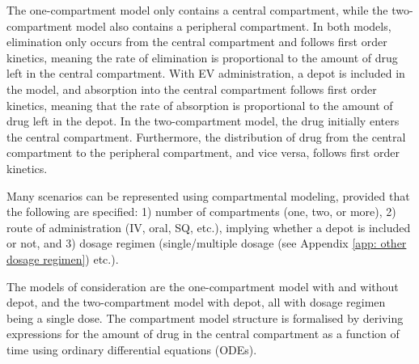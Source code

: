 
The one-compartment model only contains a central compartment, while the two-compartment model also contains a peripheral compartment.
In both models, elimination only occurs from the central compartment and follows first order kinetics, meaning the rate of elimination is proportional to the amount of drug left in the central compartment. With EV administration, a depot is included in the model, and absorption into the central compartment follows first order kinetics, meaning that the rate of absorption is proportional to the amount of drug left in the depot. 
In the two-compartment model, the drug initially enters the central compartment. Furthermore, the distribution of drug from the central compartment to the peripheral compartment, and vice versa, follows first order kinetics. 

Many scenarios can be represented using compartmental modeling, provided that the following are specified: 1) number of compartments (one, two, or more), 2) route of administration (IV, oral, SQ, etc.), implying whether a depot is included or not, and 3) dosage regimen (single/multiple dosage (see Appendix \ref{app: other dosage regimen}) etc.).


The models of consideration are the one-compartment model with and without depot, and the two-compartment model with depot, all with dosage regimen being a single dose. The compartment model structure is formalised by deriving expressions for the amount of drug in the central compartment as a function of time using ordinary differential equations (ODEs). 




